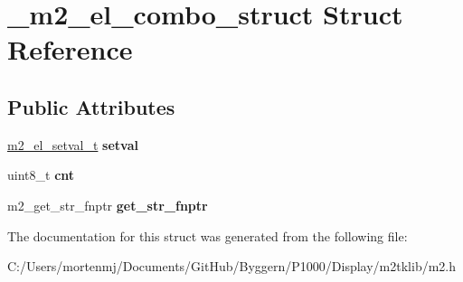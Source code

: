 \hypertarget{struct__m2__el__combo__struct}{\section{\-\_\-m2\-\_\-el\-\_\-combo\-\_\-struct Struct Reference}
\label{struct__m2__el__combo__struct}
}
\subsection*{Public Attributes}
\begin{DoxyCompactItemize}
\item 
\hypertarget{struct__m2__el__combo__struct_a6bc33f330da2cd4d9a7d6eb85ab55f95}{\hyperlink{struct__m2__el__setval__struct}{m2\-\_\-el\-\_\-setval\-\_\-t} {\bfseries setval}}\label{struct__m2__el__combo__struct_a6bc33f330da2cd4d9a7d6eb85ab55f95}

\item 
\hypertarget{struct__m2__el__combo__struct_a6d4dc6f2bdf97573d862b761a2ffe6dd}{uint8\-\_\-t {\bfseries cnt}}\label{struct__m2__el__combo__struct_a6d4dc6f2bdf97573d862b761a2ffe6dd}

\item 
\hypertarget{struct__m2__el__combo__struct_a3f054dc9d55b6d813277e4a3e302842c}{m2\-\_\-get\-\_\-str\-\_\-fnptr {\bfseries get\-\_\-str\-\_\-fnptr}}\label{struct__m2__el__combo__struct_a3f054dc9d55b6d813277e4a3e302842c}

\end{DoxyCompactItemize}


The documentation for this struct was generated from the following file\-:\begin{DoxyCompactItemize}
\item 
C\-:/\-Users/mortenmj/\-Documents/\-Git\-Hub/\-Byggern/\-P1000/\-Display/m2tklib/m2.\-h\end{DoxyCompactItemize}
